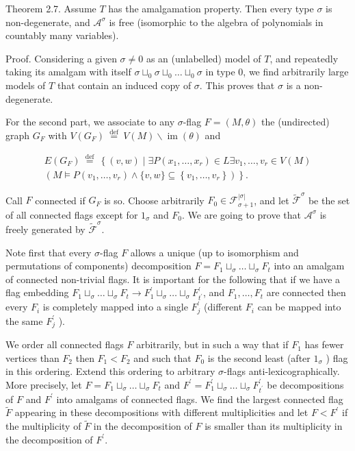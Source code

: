 \documentclass[10pt]{article}
\begin{document}
Theorem 2.7. Assume $T$ has the amalgamation property. Then every type $\sigma$ is non-degenerate, and $\mathcal{A}^{\sigma}$ is free (isomorphic to the algebra of polynomials in countably many variables).

Proof. Considering a given $\sigma \neq 0$ as an (unlabelled) model of $T$, and repeatedly taking its amalgam with itself $\sigma \sqcup_{0} \sigma \sqcup_{0} \ldots \sqcup_{0} \sigma$ in type 0, we find arbitrarily large models of $T$ that contain an induced copy of $\sigma$. This proves that $\sigma$ is a non-degenerate.

For the second part, we associate to any $\sigma$-flag $F=(M, \theta)$ the (undirected) graph $G_{F}$ with $V\left(G_{F}\right) \stackrel{\text { def }}{=} V(M) \backslash \operatorname{im}(\theta)$ and

$$
\begin{gathered}
E\left(G_{F}\right) \stackrel{\text { def }}{=}\left\{(v, w) \mid \exists P\left(x_{1}, \ldots, x_{r}\right) \in L \exists v_{1}, \ldots, v_{r} \in V(M)\right. \\
\left.\left(M \models P\left(v_{1}, \ldots, v_{r}\right) \wedge\{v, w\} \subseteq\left\{v_{1}, \ldots, v_{r}\right\}\right)\right\} .
\end{gathered}
$$

Call $F$ connected if $G_{F}$ is so. Choose arbitrarily $F_{0} \in \mathcal{F}_{\sigma+1}^{|\sigma|}$, and let $\widetilde{\mathcal{F}}^{\sigma}$ be the set of all connected flags except for $1_{\sigma}$ and $F_{0}$. We are going to prove that $\mathcal{A}^{\sigma}$ is freely generated by $\widetilde{\mathcal{F}}^{\sigma}$.

Note first that every $\sigma$-flag $F$ allows a unique (up to isomorphism and permutations of components) decomposition $F=F_{1} \sqcup_{\sigma} \ldots \sqcup_{\sigma} F_{t}$ into an amalgam of connected non-trivial flags. It is important for the following that if we have a flag embedding $F_{1} \sqcup_{\sigma} \ldots \sqcup_{\sigma} F_{t} \longrightarrow F_{1}^{\prime} \sqcup_{\sigma} \ldots \sqcup_{\sigma} F_{t^{\prime}}^{\prime}$, and $F_{1}, \ldots, F_{t}$ are connected then every $F_{i}$ is completely mapped into a single $F_{j}^{\prime}$ (different $F_{i}$ can be mapped into the same $F_{j}^{\prime}$ ).

We order all connected flags $F$ arbitrarily, but in such a way that if $F_{1}$ has fewer vertices than $F_{2}$ then $F_{1}<F_{2}$ and such that $F_{0}$ is the second least (after $1_{\sigma}$ ) flag in this ordering. Extend this ordering to arbitrary $\sigma$-flags anti-lexicographically. More precisely, let $F=F_{1} \sqcup_{\sigma} \ldots \sqcup_{\sigma} F_{t}$ and $F^{\prime}=F_{1}^{\prime} \sqcup_{\sigma} \ldots \sqcup_{\sigma} F_{t^{\prime}}^{\prime}$ be decompositions of $F$ and $F^{\prime}$ into amalgams of connected flags. We find the largest connected flag $\widetilde{F}$ appearing in these decompositions with different multiplicities and let $F<F^{\prime}$ if the multiplicity of $\widetilde{F}$ in the decomposition of $F$ is smaller than its multiplicity in the decomposition of $F^{\prime}$.
\end{document}
